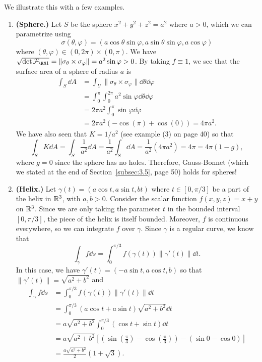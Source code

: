 We illustrate this with a few examples. 
\begin{enumerate}[(1)]
    \item {\bf (Sphere.)} Let $S$ be the sphere $x^2 + y^2 + z^2 = a^2$ where $a > 0$, 
    which we can parametrize using
    \[ \sigma(\theta, \varphi) = (a\cos\theta\sin\varphi, a\sin\theta\sin\varphi, a\cos\varphi) \] 
    where $(\theta, \varphi) \in (0, 2\pi) \times (0, \pi)$. We have
    $\sqrt{\det\FFF} = \|\sigma_\theta \times \sigma_\varphi\| = a^2\sin\varphi > 0$. 
    By taking $f \equiv 1$, we see that the surface area of a sphere of radius $a$ is 
    \begin{align*}
        \int_S \dd A &= \int_U \|\sigma_\theta \times \sigma_\varphi\|\dd\theta \dd\varphi \\
        &= \int_0^\pi \int_0^{2\pi} a^2\sin\varphi \dd\theta \dd\varphi \\ 
        &= 2\pi a^2 \int_0^\pi \sin\varphi\dd\varphi \\ 
        &= 2\pi a^2(-\cos(\pi) + \cos(0)) = 4\pi a^2. 
    \end{align*}
    We have also seen that $K = 1/a^2$ (see example (3) on page 40) so that 
    \[ \int_S K\dd A = \int_S \frac{1}{a^2} \dd A = \frac{1}{a^2} \int_S \dd A 
    = \frac{1}{a^2} (4\pi a^2) = 4\pi = 4\pi(1-g), \] 
    where $g = 0$ since the sphere has no holes. Therefore, Gauss-Bonnet 
    (which we stated at the end of Section~\ref{subsec:3.5}, page 50) holds 
    for spheres!

    \item {\bf (Helix.)} Let $\gamma(t) = (a\cos t, a\sin t, bt)$ where 
    $t \in [0, \pi/3]$ be a part of the helix in $\mathbb{R}^3$, with $a, b > 0$. 
    Consider the scalar function $f(x, y, z) = x + y$ on $\mathbb{R}^3$. Since 
    we are only taking the parameter $t$ in the bounded interval $[0, \pi/3]$, 
    the piece of the helix is itself bounded. Moreover, $f$ is continuous 
    everywhere, so we can integrate $f$ over $\gamma$. Since $\gamma$ is a 
    regular curve, we know that 
    \[ \int_\gamma f\dd s = \int_0^{\pi/3} f(\gamma(t))\|\gamma'(t)\|\dd t. \] 
    In this case, we have $\gamma'(t) = (-a\sin t, a\cos t, b)$ so that 
    $\|\gamma'(t)\| = \sqrt{a^2 + b^2}$ and 
    \begin{align*}
        \int_\gamma f\dd s &= \int_0^{\pi/3} f(\gamma(t)) \|\gamma'(t)\|\dd t \\ 
        &= \int_0^{\pi/3} (a\cos t + a\sin t) \sqrt{a^2 + b^2}\dd t \\ 
        &= a\sqrt{a^2 + b^2} \int_0^{\pi/3} (\cos t + \sin t)\dd t \\ 
        &= a\sqrt{a^2 + b^2} \left[\left(\sin\left(\frac{\pi}{3}\right) - 
        \cos\left(\frac{\pi}{3}\right)\right) - (\sin 0 - \cos 0)\right] \\
        &= \frac{a\sqrt{a^2 + b^2}}{2} (1 + \sqrt{3}). 
    \end{align*}


\end{enumerate}
